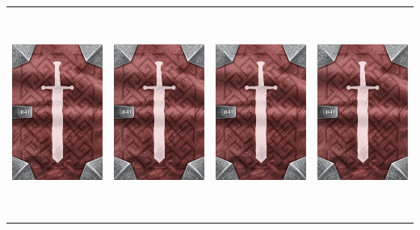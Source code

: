 \documentclass{minimal}
\begin{document}
{\begin{longtable}{llll}
\includegraphics[width=44mm,height=68mm]{./36-42/gh-041-major-power-potion-back.png} &
\includegraphics[width=44mm,height=68mm]{./36-42/gh-041-major-power-potion-back.png} &
\includegraphics[width=44mm,height=68mm]{./36-42/gh-041-major-power-potion-back.png} &
\includegraphics[width=44mm,height=68mm]{./36-42/gh-041-major-power-potion-back.png}\\ 

\end{longtable}}
\end{document}
